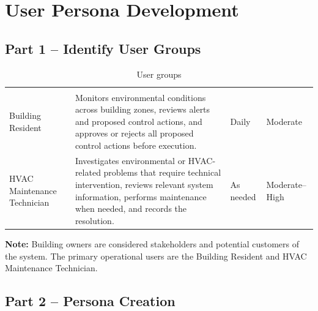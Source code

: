 \documentclass[11pt,a4paper]{article}
\begin{document}
\makecover

\section{User Persona Development}

\subsection*{Part 1 -- Identify User Groups}

{\small\stripe
\begin{xltabular}{\linewidth}{|B{3.3cm}|Y|L{2.3cm}|L{2.4cm}|}
\caption{User groups}\label{tab:groups}\\
\hline\headrow
{} &  &  & \\\hline
\endfirsthead
\hline\headrow
{} &  &  & \\\hline
\endhead
Building Resident & Monitors environmental conditions across building zones, reviews alerts and proposed control actions, and approves or rejects all proposed control actions before execution. & Daily & Moderate\\\hline
HVAC Maintenance Technician & Investigates environmental or HVAC-related problems that require technical intervention, reviews relevant system information, performs maintenance when needed, and records the resolution. & As needed & Moderate--High\\\hline
\end{xltabular}}

\begin{zinfo}
\textbf{Note:} Building owners are considered stakeholders and potential customers of the system. The primary operational users are the Building Resident and HVAC Maintenance Technician.
\end{zinfo}

\subsection*{Part 2 -- Persona Creation}
\end{document}
